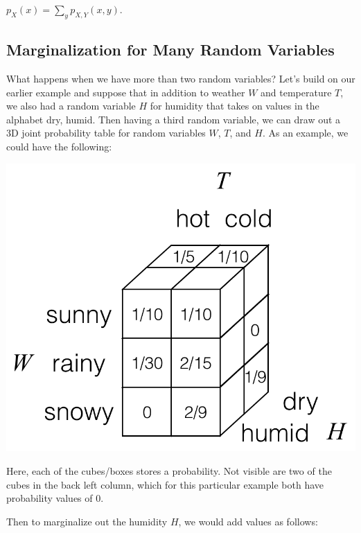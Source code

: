 \documentclass[6008notes.tex]{subfiles}
\begin{document}
{\centering$p_{X}(x)=\sum _{y}p_{X,Y}(x,y).$ \par}
 
\subsection{Marginalization for Many Random Variables}

What happens when we have more than two random variables? Let's build on our earlier example and suppose that in addition to weather $W$ and temperature $T$, we also had a random variable $H$ for humidity that takes on values in the alphabet {dry, humid}. Then having a third random variable, we can draw out a 3D joint probability table for random variables $W$, $T$, and $H$. As an example, we could have the following:

{\centering\includegraphics[scale=0.4]{images_sec-joint-rv-marg-many-rv-joint-table} \par}

Here, each of the cubes/boxes stores a probability. Not visible are two of the cubes in the back left column, which for this particular example both have probability values of 0.

Then to marginalize out the humidity $H$, we would add values as follows:
\end{document}
